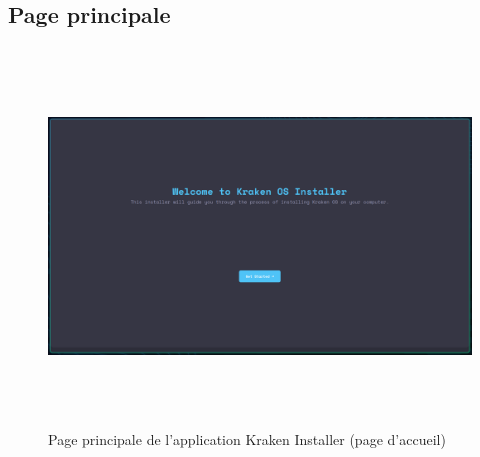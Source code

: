 \subsection{ Page principale}
\begin{figure}[H]
  \centering
  \includegraphics[width=1\textwidth, height=10cm]{images_pfe/mainwindow.png}
  \caption{Page principale de l'application Kraken Installer (page d'accueil)}
  \label{fig:mwindow}
\end{figure}








